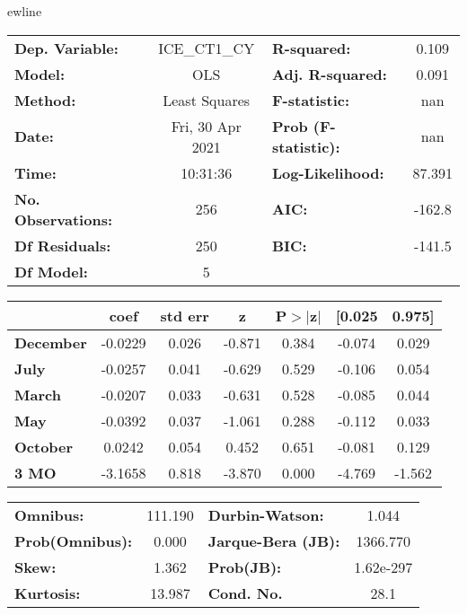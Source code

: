 ewline\begin{center}
\begin{tabular}{lclc}
\toprule
\textbf{Dep. Variable:}    &   ICE\_CT1\_CY   & \textbf{  R-squared:         } &     0.109   \\
\textbf{Model:}            &       OLS        & \textbf{  Adj. R-squared:    } &     0.091   \\
\textbf{Method:}           &  Least Squares   & \textbf{  F-statistic:       } &       nan   \\
\textbf{Date:}             & Fri, 30 Apr 2021 & \textbf{  Prob (F-statistic):} &      nan    \\
\textbf{Time:}             &     10:31:36     & \textbf{  Log-Likelihood:    } &    87.391   \\
\textbf{No. Observations:} &         256      & \textbf{  AIC:               } &    -162.8   \\
\textbf{Df Residuals:}     &         250      & \textbf{  BIC:               } &    -141.5   \\
\textbf{Df Model:}         &           5      & \textbf{                     } &             \\
\bottomrule
\end{tabular}
\begin{tabular}{lcccccc}
                  & \textbf{coef} & \textbf{std err} & \textbf{z} & \textbf{P$> |$z$|$} & \textbf{[0.025} & \textbf{0.975]}  \\
\midrule
\textbf{December} &      -0.0229  &        0.026     &    -0.871  &         0.384        &       -0.074    &        0.029     \\
\textbf{July}     &      -0.0257  &        0.041     &    -0.629  &         0.529        &       -0.106    &        0.054     \\
\textbf{March}    &      -0.0207  &        0.033     &    -0.631  &         0.528        &       -0.085    &        0.044     \\
\textbf{May}      &      -0.0392  &        0.037     &    -1.061  &         0.288        &       -0.112    &        0.033     \\
\textbf{October}  &       0.0242  &        0.054     &     0.452  &         0.651        &       -0.081    &        0.129     \\
\textbf{3 MO}     &      -3.1658  &        0.818     &    -3.870  &         0.000        &       -4.769    &       -1.562     \\
\bottomrule
\end{tabular}
\begin{tabular}{lclc}
\textbf{Omnibus:}       & 111.190 & \textbf{  Durbin-Watson:     } &     1.044  \\
\textbf{Prob(Omnibus):} &   0.000 & \textbf{  Jarque-Bera (JB):  } &  1366.770  \\
\textbf{Skew:}          &   1.362 & \textbf{  Prob(JB):          } & 1.62e-297  \\
\textbf{Kurtosis:}      &  13.987 & \textbf{  Cond. No.          } &      28.1  \\
\bottomrule
\end{tabular}
\end{center}


